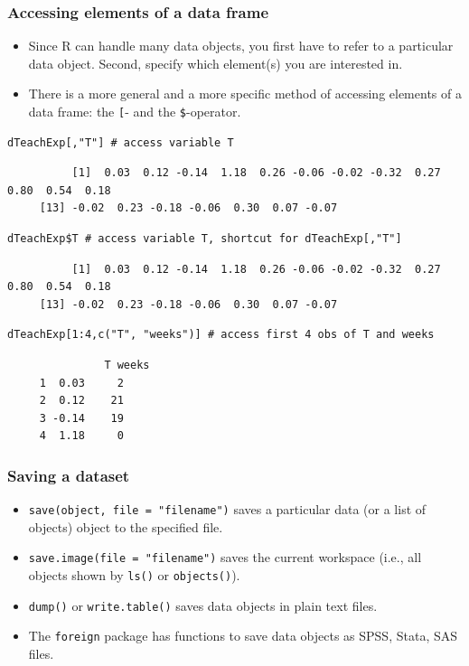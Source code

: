 \documentclass[bigger]{beamer}
\begin{document}
\begin{frame}[fragile,shrink=5]
\frametitle{Accessing elements of a data frame}
\label{sec-3-1-6}

\begin{itemize}
\item Since R can handle many data objects, you first have to refer to a
      particular data object. Second, specify which element(s) you are interested
      in.
\item There is a more general and a more specific method of accessing elements
      of a data frame: the \texttt{[}- and the \texttt{\$}-operator.
\end{itemize}


\lstset{language=R}
\begin{lstlisting}
dTeachExp[,"T"] # access variable T
\end{lstlisting}

\begin{verbatim}
          [1]  0.03  0.12 -0.14  1.18  0.26 -0.06 -0.02 -0.32  0.27  0.80  0.54  0.18
     [13] -0.02  0.23 -0.18 -0.06  0.30  0.07 -0.07
\end{verbatim}


\lstset{language=R}
\begin{lstlisting}
dTeachExp$T # access variable T, shortcut for dTeachExp[,"T"]
\end{lstlisting}

\begin{verbatim}
          [1]  0.03  0.12 -0.14  1.18  0.26 -0.06 -0.02 -0.32  0.27  0.80  0.54  0.18
     [13] -0.02  0.23 -0.18 -0.06  0.30  0.07 -0.07
\end{verbatim}



\lstset{language=R}
\begin{lstlisting}
dTeachExp[1:4,c("T", "weeks")] # access first 4 obs of T and weeks
\end{lstlisting}

\begin{verbatim}
               T weeks
     1  0.03     2
     2  0.12    21
     3 -0.14    19
     4  1.18     0
\end{verbatim}

 
\end{frame}
\begin{frame}
\frametitle{Saving a dataset}
\label{sec-3-1-7}

\begin{itemize}
\item \texttt{save(object, file = "filename")} saves a particular data (or a list of objects) object to the
      specified file.
\item \texttt{save.image(file = "filename")} saves the current workspace (i.e., all objects shown by \texttt{ls()} or
      \texttt{objects()}).
\item \texttt{dump()} or \texttt{write.table()} saves data objects in plain text files.
\item The \texttt{foreign} package has functions to save data objects as SPSS, Stata, SAS files.
\end{itemize}
\end{frame}
\end{document}
